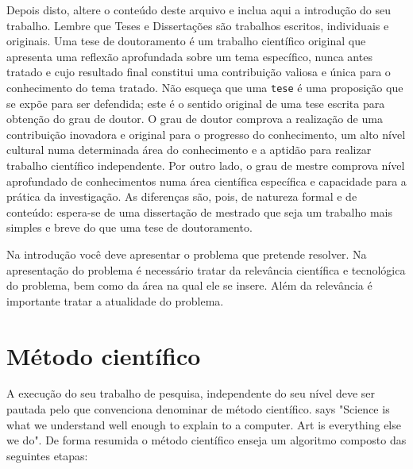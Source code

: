 Depois disto, altere o conteúdo deste arquivo e inclua aqui a introdução do seu trabalho. Lembre que Teses e Dissertações são trabalhos escritos, individuais e
originais. Uma tese de doutoramento é um trabalho científico original
que apresenta uma reflexão aprofundada sobre um tema específico,
nunca antes tratado e cujo resultado final constitui uma contribuição
valiosa e única para o conhecimento do tema tratado. Não esqueça
que uma \texttt{tese} é uma proposição que se expõe para ser
defendida; este é o sentido original de uma tese escrita para
obtenção do grau de doutor. O grau de doutor comprova a
realização de uma contribuição inovadora e original para o
progresso do conhecimento, um alto nível cultural numa determinada
área do conhecimento e a aptidão para realizar trabalho
científico independente. Por outro lado, o grau de mestre comprova nível aprofundado
de conhecimentos numa área científica específica e capacidade
para a prática da investigação. As diferenças são, pois,
de natureza formal e de conteúdo: espera-se de uma dissertação de
mestrado que seja um trabalho mais simples e breve do que uma tese de doutoramento.

Na introdução você deve apresentar o problema que pretende resolver. Na apresentação do problema é necessário tratar da relevância científica e tecnológica do problema, bem como da área na qual ele se insere. Além da relevância é importante tratar a atualidade do problema. 

\section{Método científico}
A execução do seu trabalho de pesquisa, independente do seu nível deve ser pautada pelo que convenciona denominar de método científico. 
\citeauthor{knuth:tex} says "Science is what we understand well enough to explain to a computer. Art is everything else we do". De forma resumida o método científico enseja um algoritmo composto das seguintes etapas:

